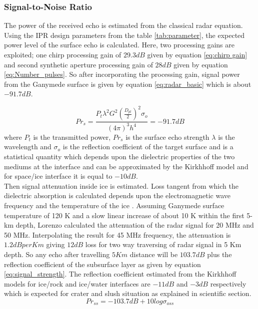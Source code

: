 \subsubsection{Signal-to-Noise Ratio}

The power of the received echo is estimated from the classical radar equation. Using the \ac{IPR} design parameters from the table \ref{tab:parameter}, the expected power level of the surface echo is calculated. Here, two processing gains are exploited; one chirp processing gain of $29.3 dB$ given by equation \ref{eq:chirp gain} and second synthetic aperture processing gain of $28 dB$ given by equation \ref{eq:Number_pulses}. So after incorporating the processing gain, signal power from the Ganymede surface is given by equation \ref{eq:radar_basic} which is about $-91.7 dB$.

\begin{equation}
Pr_{s} = \dfrac{P_{t}\lambda^{2}G^{2}(\frac{D_{pl}}{2})^{2}\sigma_{o}}{(4\pi)^{3}h^{4}} 
	  = -91.7 dB 
\label{eq:radar_basic}
\end{equation}
where $P_{t}$ is the transmitted power, $Pr_{s}$ is the surface echo strength $\lambda$ is the wavelength  and $\sigma_{o}$ is the reflection coefficient of the target surface and is a statistical quantity which depends upon the dielectric properties of the two mediums at the interface and can be approximated by the Kirkhhoff model \cite{MIMOSA} and for space/ice interface it is equal to $-10 dB$.\\
%
Then signal attenuation inside ice is estimated. Loss tangent from which the dielectric absorption is calculated depends upon the electromagnetic wave frequency and the temperature of the ice \cite{MIMOSA}. Assuming Ganymede surface temperature of 120 K and a slow linear increase of about 10 K within the first 5-km depth, Lorenzo \cite{Gany_SRS} calculated the attenuation of the radar signal for 20 MHz and 50 MHz. Interpolating the result for 45 MHz frequency, the attenuation is $1.2 dB per Km$ giving $12 dB$ loss for two way traversing of radar signal in 5 Km depth. So any echo after travelling $5 Km $ distance will be $103.7 dB$ plus the reflection coefficient of the subsurface layer as given by equation \ref{eq:signal_strength}. The reflection coefficient estimated from the Kirkhhoff models for ice/rock and ice/water interfaces are $-11 dB$ and $-3 dB$ respectively which is expected for  crater and slush situation as explained in scientific section.
%
\begin{equation}
Pr_{ss} = -103.7 dB + 10 log \sigma_{oss}
\label{eq:signal_strength}
\end{equation}
